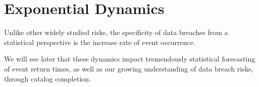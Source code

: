 \section*{Exponential Dynamics}
Unlike other widely studied risks, the specificity of data breaches from a statistical perspective is the increase rate of event occurrence. 

We will see later that these dynamics impact tremendously statistical forecasting of event return times, as well as our growing understanding of data breach risks, through catalog completion.



